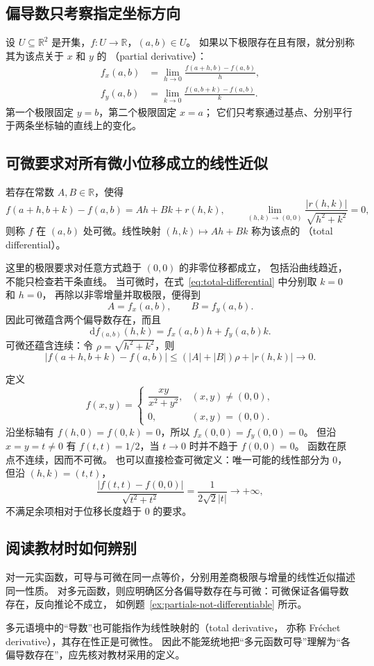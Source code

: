 \documentclass{ctexart}
\begin{document}
\subsection{偏导数只考察指定坐标方向}

设 $U\subseteq\mathbb R^2$ 是开集，$f:U\to\mathbb R$，$(a,b)\in U$。
如果以下极限存在且有限，就分别称其为该点关于 $x$ 和 $y$ 的
（partial derivative）：
\begin{align*}
  f_x(a,b)&=\lim_{h\to0}\frac{f(a+h,b)-f(a,b)}{h},\\
  f_y(a,b)&=\lim_{k\to0}\frac{f(a,b+k)-f(a,b)}{k}.
\end{align*}
第一个极限固定 $y=b$，第二个极限固定 $x=a$；
它们只考察通过基点、分别平行于两条坐标轴的直线上的变化。

\subsection{可微要求对所有微小位移成立的线性近似}

\begin{definition}[二元函数可微]
\label{def:total-differentiability}
若存在常数 $A,B\in\mathbb R$，使得
\begin{equation}\label{eq:total-differential}
  f(a+h,b+k)-f(a,b)=Ah+Bk+r(h,k),
  \qquad
  \lim_{(h,k)\to(0,0)}\frac{|r(h,k)|}{\sqrt{h^2+k^2}}=0,
\end{equation}
则称 $f$ 在 $(a,b)$ 处可微。线性映射 $(h,k)\mapsto Ah+Bk$ 称为该点的
（total differential）。
\end{definition}

这里的极限要求对任意方式趋于 $(0,0)$ 的非零位移都成立，
包括沿曲线趋近，不能只检查若干条直线。
当可微时，在式~\eqref{eq:total-differential} 中分别取 $k=0$ 和 $h=0$，
再除以非零增量并取极限，便得到
\[
  A=f_x(a,b),\qquad B=f_y(a,b).
\]
因此可微蕴含两个偏导数存在，而且
\[
  \mathrm df_{(a,b)}(h,k)=f_x(a,b)h+f_y(a,b)k.
\]
可微还蕴含连续：令 $\rho=\sqrt{h^2+k^2}$，则
\[
  |f(a+h,b+k)-f(a,b)|
  \le (|A|+|B|)\rho+|r(h,k)|\longrightarrow0.
\]

\begin{example}
\label{ex:partials-not-differentiable}
定义
\[
  f(x,y)=
  \begin{cases}
    \dfrac{xy}{x^2+y^2},&(x,y)\ne(0,0),\\
    0,&(x,y)=(0,0).
  \end{cases}
\]
沿坐标轴有 $f(h,0)=f(0,k)=0$，所以 $f_x(0,0)=f_y(0,0)=0$。
但沿 $x=y=t\ne0$ 有 $f(t,t)=1/2$，当 $t\to0$ 时并不趋于 $f(0,0)=0$。
函数在原点不连续，因而不可微。
也可以直接检查可微定义：唯一可能的线性部分为 $0$，但沿 $(h,k)=(t,t)$，
\[
  \frac{|f(t,t)-f(0,0)|}{\sqrt{t^2+t^2}}
  =\frac{1}{2\sqrt{2}|t|}\longrightarrow+\infty,
\]
不满足余项相对于位移长度趋于 $0$ 的要求。
\end{example}

\subsection{阅读教材时如何辨别}

对一元实函数，可导与可微在同一点等价，分别用差商极限与增量的线性近似描述同一性质。
对多元函数，则应明确区分各偏导数存在与可微：可微保证各偏导数存在，反向推论不成立，
如例题~\ref{ex:partials-not-differentiable} 所示。

多元语境中的“导数”也可能指作为线性映射的（total derivative，
亦称 Fr\'{e}chet derivative），其存在性正是可微性。
因此不能笼统地把“多元函数可导”理解为“各偏导数存在”，应先核对教材采用的定义。
\end{document}
